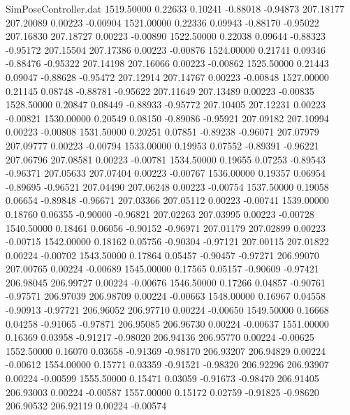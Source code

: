 \begin{filecontents}{SimPoseController.dat}
1519.50000    0.22633    0.10241    -0.88018   -0.94873  207.18177  207.20089    0.00223   -0.00904
1521.00000    0.22336    0.09943    -0.88170   -0.95022  207.16830  207.18727    0.00223   -0.00890
1522.50000    0.22038    0.09644    -0.88323   -0.95172  207.15504  207.17386    0.00223   -0.00876
1524.00000    0.21741    0.09346    -0.88476   -0.95322  207.14198  207.16066    0.00223   -0.00862
1525.50000    0.21443    0.09047    -0.88628   -0.95472  207.12914  207.14767    0.00223   -0.00848
1527.00000    0.21145    0.08748    -0.88781   -0.95622  207.11649  207.13489    0.00223   -0.00835
1528.50000    0.20847    0.08449    -0.88933   -0.95772  207.10405  207.12231    0.00223   -0.00821
1530.00000    0.20549    0.08150    -0.89086   -0.95921  207.09182  207.10994    0.00223   -0.00808
1531.50000    0.20251    0.07851    -0.89238   -0.96071  207.07979  207.09777    0.00223   -0.00794
1533.00000    0.19953    0.07552    -0.89391   -0.96221  207.06796  207.08581    0.00223   -0.00781
1534.50000    0.19655    0.07253    -0.89543   -0.96371  207.05633  207.07404    0.00223   -0.00767
1536.00000    0.19357    0.06954    -0.89695   -0.96521  207.04490  207.06248    0.00223   -0.00754
1537.50000    0.19058    0.06654    -0.89848   -0.96671  207.03366  207.05112    0.00223   -0.00741
1539.00000    0.18760    0.06355    -0.90000   -0.96821  207.02263  207.03995    0.00223   -0.00728
1540.50000    0.18461    0.06056    -0.90152   -0.96971  207.01179  207.02899    0.00223   -0.00715
1542.00000    0.18162    0.05756    -0.90304   -0.97121  207.00115  207.01822    0.00224   -0.00702
1543.50000    0.17864    0.05457    -0.90457   -0.97271  206.99070  207.00765    0.00224   -0.00689
1545.00000    0.17565    0.05157    -0.90609   -0.97421  206.98045  206.99727    0.00224   -0.00676
1546.50000    0.17266    0.04857    -0.90761   -0.97571  206.97039  206.98709    0.00224   -0.00663
1548.00000    0.16967    0.04558    -0.90913   -0.97721  206.96052  206.97710    0.00224   -0.00650
1549.50000    0.16668    0.04258    -0.91065   -0.97871  206.95085  206.96730    0.00224   -0.00637
1551.00000    0.16369    0.03958    -0.91217   -0.98020  206.94136  206.95770    0.00224   -0.00625
1552.50000    0.16070    0.03658    -0.91369   -0.98170  206.93207  206.94829    0.00224   -0.00612
1554.00000    0.15771    0.03359    -0.91521   -0.98320  206.92296  206.93907    0.00224   -0.00599
1555.50000    0.15471    0.03059    -0.91673   -0.98470  206.91405  206.93003    0.00224   -0.00587
1557.00000    0.15172    0.02759    -0.91825   -0.98620  206.90532  206.92119    0.00224   -0.00574

\end{filecontents}
